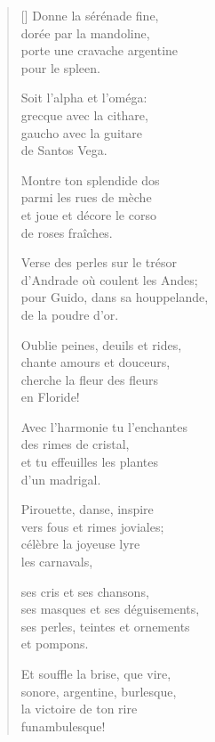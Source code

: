 \begin{verse}[\versewidth]
Donne la sérénade fine, \\
dorée par la mandoline, \\
porte une cravache argentine \\
pour le spleen.

Soit l'alpha et l'oméga: \\
grecque avec la cithare, \\
gaucho avec la guitare \\
de Santos Vega.

Montre ton splendide dos \\
parmi les rues de mèche \\
et joue et décore le corso \\
de roses fraîches.

Verse des perles sur le trésor \\
d'Andrade où coulent les Andes; \\
pour Guido, dans sa houppelande, \\
de la poudre d'or.

Oublie peines, deuils et rides, \\
chante amours et douceurs, \\
cherche la fleur des fleurs \\
en Floride!

Avec l'harmonie tu l'enchantes \\
des rimes de cristal, \\
et tu effeuilles les plantes \\
d'un madrigal.

Pirouette, danse, inspire \\
vers fous et rimes joviales; \\
célèbre la joyeuse lyre \\
les carnavals,

ses cris et ses chansons, \\
ses masques et ses déguisements, \\
ses perles, teintes et ornements \\
et pompons.

Et souffle la brise, que vire, \\
sonore, argentine, burlesque, \\
la victoire de ton rire \\
funambulesque!
\end{verse}

\cleardoublepage




